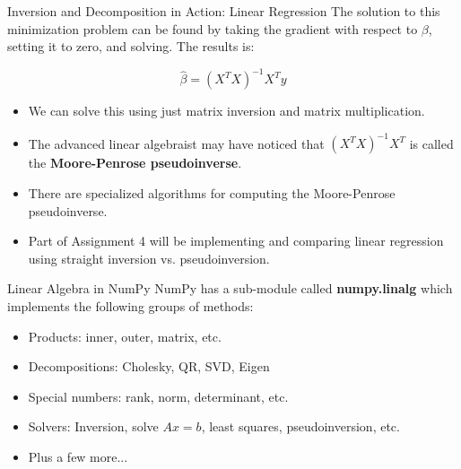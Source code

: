 \documentclass[serif,xcolor=pdftex,dvipsnames,table,hyperref={bookmarks=false,breaklinks}]{beamer}
\begin{document}
\begin{frame}[t]{Inversion and Decomposition in Action: Linear Regression}
	The solution to this minimization problem can be found by taking the gradient with respect to $\beta$, setting it to zero, and solving. The results is:
	
	$$\hat{\beta} = (X^T X)^{-1}X^Ty$$
	
	\pause
	\begin{itemize}[<+->]
		\item We can solve this using just matrix inversion and matrix multiplication.
		\item The advanced linear algebraist may have noticed that $(X^T X)^{-1} X^T$ is called the \textbf{Moore-Penrose pseudoinverse}.
		\item There are specialized algorithms for computing the Moore-Penrose pseudoinverse.
		\item Part of Assignment 4 will be implementing and comparing linear regression using straight inversion vs. pseudoinversion.
	\end{itemize}

\end{frame}


\begin{frame}[t]{Linear Algebra in NumPy}
	NumPy has a sub-module called \textbf{numpy.linalg} which implements the following groups of methods:
	\pause
	\begin{itemize}[<+->]
		\item Products: inner, outer, matrix, etc.
		\item Decompositions: Cholesky, QR, SVD, Eigen
		\item Special numbers: rank, norm, determinant, etc.
		\item Solvers: Inversion, solve $Ax = b$, least squares, pseudoinversion, etc.
		\item Plus a few more...
	\end{itemize}
\end{frame}
\end{document}
